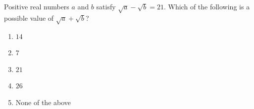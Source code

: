 Positive real numbers $a$ and $b$ satisfy $\sqrt a-\sqrt b=21$. Which of the following is a possible value of $\sqrt a+\sqrt b$?
\begin{enumerate}
\item[(a)] $14$
\item[(b)] $7$
\item[(c)] $21$
\item[(d)] $26$
\item[(e)] None of the above
\end{enumerate}
